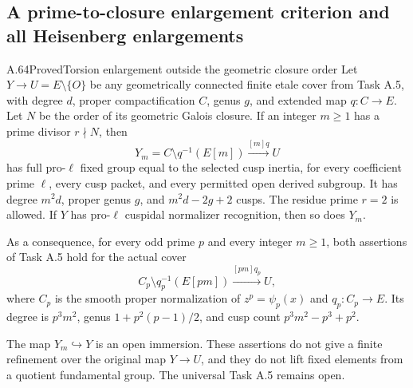\subsection{A prime-to-closure enlargement criterion and all Heisenberg enlargements}

\begin{statement}{A.64}{Proved}{Torsion enlargement outside the geometric closure order}
Let \(Y\to U=E\setminus\{O\}\) be any geometrically
connected finite etale cover from Task A.5, with degree
\(d\), proper compactification \(C\), genus \(g\), and
extended map \(q:C\to E\). Let \(N\) be the order of
its geometric Galois closure. If an integer \(m\ge1\)
has a prime divisor \(r\nmid N\), then
\[
 Y_m=C\setminus q^{-1}(E[m])
                \xrightarrow{[m]q}U                   \tag{A.64.1}
\]
has full pro-\(\ell\) fixed group equal to the selected
cusp inertia, for every coefficient prime \(\ell\),
every cusp packet, and every permitted open derived
subgroup. It has degree \(m^2d\), proper genus \(g\),
and \(m^2d-2g+2\) cusps. The residue prime \(r=2\)
is allowed. If \(Y\) has pro-\(\ell\) cuspidal
normalizer recognition, then so does \(Y_m\).

As a consequence, for every odd prime \(p\) and every
integer \(m\ge1\), both assertions of Task A.5 hold
for the actual cover
\[
 C_p\setminus q_p^{-1}(E[pm])
                  \xrightarrow{[pm]q_p}U,             \tag{A.64.2}
\]
where \(C_p\) is the smooth proper normalization of
\(z^p=\psi_p(x)\) and \(q_p:C_p\to E\).
Its degree is \(p^3m^2\), genus
\(1+p^2(p-1)/2\), and cusp count
\(p^3m^2-p^3+p^2\).

The map \(Y_m\hookrightarrow Y\) is an open immersion.
These assertions do not give a finite refinement over the
original map \(Y\to U\), and they do not lift fixed
elements from a quotient fundamental group. The universal
Task A.5 remains open.
\end{statement}

